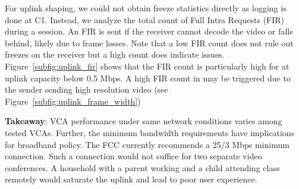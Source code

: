 For uplink shaping, we could not obtain freeze statistics directly as logging is done at C1. Instead, we analyze the total count of Full Intra Requests (FIR) during a session. An FIR is sent if the receiver cannot decode the video or falls behind, likely due to frame losses. Note that a low FIR count does not rule out freezes on the receiver but a high count does indicate issues. Figure~\ref{subfig:uplink_fir} shows that the FIR count is particularly high for \teamsbrowser at uplink capacity below 0.5 Mbps. A high FIR count in \teamsbrowser may be triggered due to the sender sending high resolution video (see Figure~\ref{subfig:uplink_frame_width})



\textbf{Takeaway}: VCA performance under same network conditions varies among tested VCAs. Further, the minimum bandwidth requirements have implications for broadband policy. The FCC currently recommends a 25/3 Mbps minimum connection. Such a connection would not suffice for two separate video conferences. A household with a parent working and a child attending class remotely would saturate the uplink and lead to poor user experience. 







